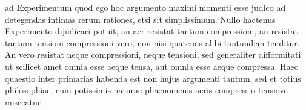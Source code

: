  \pstart {}  ad Experimentum quod ego  hoc argumento maximi momenti esse judico ad detegendas intimas rerum rationes, etsi sit simplissimum. Nullo hactenus Experimento dijudicari potuit, an aer resistat tantum compressioni\protect{},  an  resistat tantum tensioni\protect{}  compressioni\protect{} vero, non nisi quatenus alibi tantundem tenditur. An vero resistat neque compressioni, neque tensioni\protect{}, sed generaliter difformitati ut scilicet amet omnia esse aeque tensa, aut omnia esse aeque compressa. Haec quaestio inter primarias habenda est non hujus argumenti tantum, sed et totius philosophiae, cum potissimis naturae phaenomenis aeris compressio\protect{} tensiove\protect{} misceatur.
